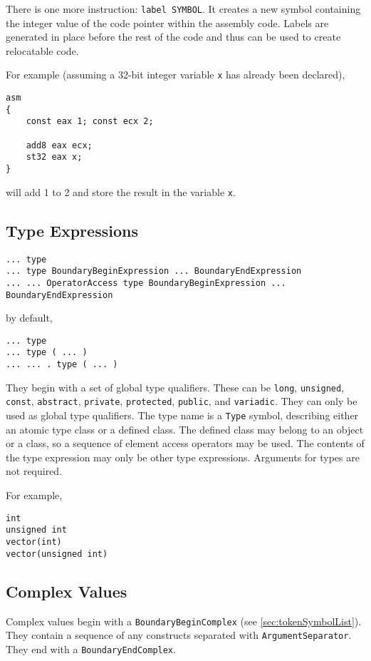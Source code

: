 \documentclass[10pt,a4paper]{article}
\begin{document}
There is one more instruction: \verb|label SYMBOL|. It creates a new symbol containing the integer value of the code pointer within the assembly code. Labels are generated in place before the rest of the code and thus can be used to create relocatable code.

For example (assuming a 32-bit integer variable \verb|x| has already been declared),
\begin{verbatim}
asm
{
    const eax 1; const ecx 2;
    
    add8 eax ecx;
    st32 eax x;
}
\end{verbatim}
will add 1 to 2 and store the result in the variable \verb|x|.

\subsection{Type Expressions}
\label{sec:typeExpressions}
\begin{verbatim}
... type
... type BoundaryBeginExpression ... BoundaryEndExpression
... ... OperatorAccess type BoundaryBeginExpression ... BoundaryEndExpression
\end{verbatim}

by default,
\begin{verbatim}
... type
... type ( ... )
... ... . type ( ... )
\end{verbatim}

They begin with a set of global type qualifiers. These can be \verb|long|, \verb|unsigned|, \verb|const|, \verb|abstract|, \verb|private|, \verb|protected|, \verb|public|, and \verb|variadic|. They can only be used as global type qualifiers.
The type name is a \verb|Type| symbol, describing either an atomic type class or a defined class. The defined class may belong to an object or a class, so a sequence of element access operators may be used. The contents of the type expression may only be other type expressions. Arguments for types are not required.

For example,
\begin{verbatim}
int
unsigned int
vector(int)
vector(unsigned int)
\end{verbatim}

\subsection{Complex Values}
\label{sec:complexValues}
Complex values begin with a \verb|BoundaryBeginComplex| (see \ref{sec:tokenSymbolList}). They contain a sequence of any constructs separated with \verb|ArgumentSeparator|. They end with a \verb|BoundaryEndComplex|.
\end{document}
